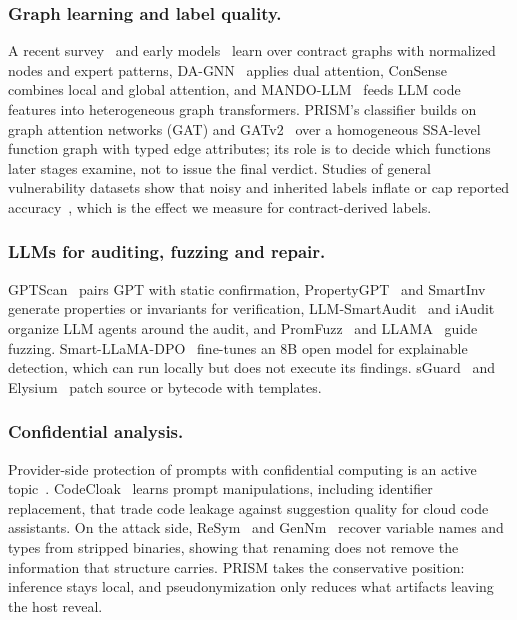 \documentclass[runningheads]{llncs}
\begin{document}
\subsubsection{Graph learning and label quality.}
A recent survey~\cite{alsunaidi2025leveraging} and early models~\cite{zhuang2021smart,liu2021combining} learn over contract graphs with normalized nodes and expert patterns, DA-GNN~\cite{zhen2024gnn} applies dual attention, ConSense~\cite{pang2025graph} combines local and global attention, and MANDO-LLM~\cite{nguyen2026mando} feeds LLM code features into heterogeneous graph transformers. PRISM's classifier builds on graph attention networks (GAT) and GATv2~\cite{velivckovic2017graph,brody2021attentive} over a homogeneous SSA-level function graph with typed edge attributes; its role is to decide which functions later stages examine, not to issue the final verdict. Studies of general vulnerability datasets show that noisy and inherited labels inflate or cap reported accuracy~\cite{croft2023data,ding2024vulnerability}, which is the effect we measure for contract-derived labels.

\subsubsection{LLMs for auditing, fuzzing and repair.}
GPTScan~\cite{sun2024gptscan} pairs GPT with static confirmation, PropertyGPT~\cite{liu2024propertygpt} and SmartInv~\cite{wang2024smartinv} generate properties or invariants for verification, LLM-SmartAudit~\cite{wei2025advanced} and iAudit~\cite{ma2025combining} organize LLM agents around the audit, and PromFuzz~\cite{lin2025promfuzz} and LLAMA~\cite{gai2026llama} guide fuzzing. Smart-LLaMA-DPO~\cite{yu2025smart} fine-tunes an 8B open model for explainable detection, which can run locally but does not execute its findings. sGuard~\cite{nguyen2021sguard} and Elysium~\cite{ferreira2022elysium} patch source or bytecode with templates.

\subsubsection{Confidential analysis.}
Provider-side protection of prompts with confidential computing is an active topic~\cite{li2024confidential}. CodeCloak~\cite{noah2025codecloak} learns prompt manipulations, including identifier replacement, that trade code leakage against suggestion quality for cloud code assistants. On the attack side, ReSym~\cite{xie2024resym} and GenNm~\cite{xu2025gennm} recover variable names and types from stripped binaries, showing that renaming does not remove the information that structure carries. PRISM takes the conservative position: inference stays local, and pseudonymization only reduces what artifacts leaving the host reveal.
\end{document}
